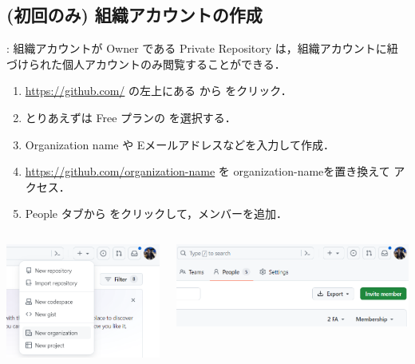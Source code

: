 \documentclass[aspectratio=169,dvipdfmx,cjk]{beamer}
\newcommand{\blue}[1]{ {\color{blue} #1} }
\begin{document}
\subsection{(初回のみ) 組織アカウントの作成}
\begin{frame}[label=organization]{\insertsection \thesubsection: \insertsubsection}
  組織アカウントが Owner である Private Repository は，組織アカウントに紐づけられた個人アカウントのみ閲覧することができる．
  \begin{enumerate}
    \item \href{https://github.com/}{https://github.com/} の左上にある \beamerbutton{+} から  をクリック．
    \item とりあえずは Free プランの  を選択する．
    \item Organization name や Eメールアドレスなどを入力して作成．
    \item \href{https://github.com/organization-name}{https://github.com/organization-name} を\blue{organization-nameを置き換えて}アクセス．
    \item People タブから  をクリックして，メンバーを追加．
  \end{enumerate}
  \begin{columns}
    \begin{column}{0.3\textwidth}
        \includegraphics[width=1.0\linewidth]{fig/new-organization.png}
    \end{column}
    \begin{column}{0.6\textwidth}
      \includegraphics[width=1.0\linewidth]{fig/invite-member.png}
    \end{column}
  \end{columns}
\end{frame}
\end{document}
